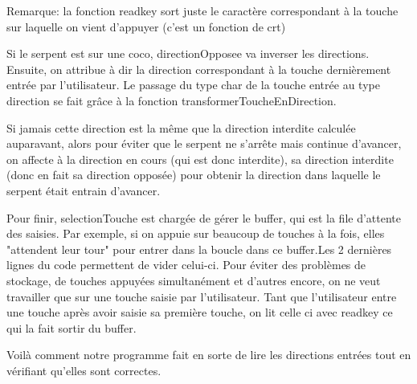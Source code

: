 \documentclass[11pt,a4paper]{article}
\begin{document}
            \normalsize
Remarque: la fonction readkey sort juste le caractère correspondant à la touche sur laquelle on vient d'appuyer (c'est un fonction de crt)

Si le serpent est sur une coco, directionOpposee va inverser les directions.
Ensuite, on attribue à dir la direction correspondant à la touche dernièrement entrée par l'utilisateur. Le passage du type char de la touche entrée au type direction se fait grâce à la fonction transformerToucheEnDirection.

Si jamais cette direction est la même que la direction interdite calculée auparavant, alors pour éviter que le serpent ne s'arrête mais continue d'avancer, on affecte à la direction en cours (qui est donc interdite), sa direction interdite (donc en fait sa direction opposée) pour obtenir la direction dans laquelle le serpent était entrain d'avancer.

Pour finir, selectionTouche est chargée de gérer le buffer, qui est la file d'attente des saisies.  Par exemple, si on appuie sur beaucoup de touches à la fois, elles "attendent leur tour" pour entrer dans la boucle dans ce buffer.Les 2 dernières lignes du code permettent de vider celui-ci. Pour éviter des problèmes de stockage, de touches appuyées simultanément et d'autres encore, on ne veut travailler que sur une touche saisie par l'utilisateur. Tant que l'utilisateur entre une touche après avoir saisie sa première touche, on lit celle ci avec readkey ce qui la fait sortir du buffer.

Voilà comment notre programme fait en sorte de lire les directions entrées tout en vérifiant qu'elles sont correctes.\\
\end{document}
